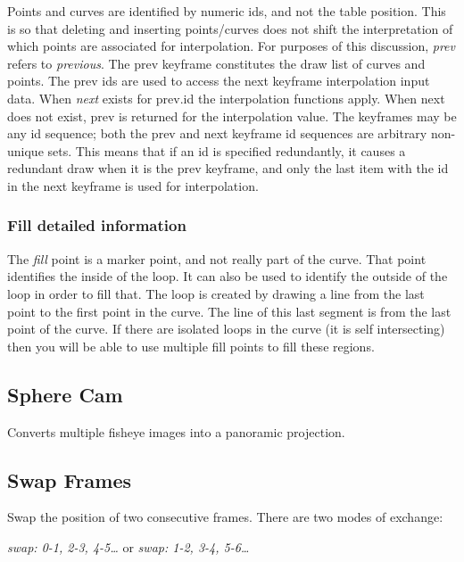 Points and curves are identified by numeric ids, and not the table position. This is so that deleting and inserting points/curves does not shift the interpretation of which points are associated for interpolation. For purposes of this discussion, \textit{prev} refers to \textit{previous}. The prev keyframe constitutes the draw list of curves and points. The prev ids are used to access the next keyframe interpolation input data. When \textit{next} exists for prev.id the interpolation functions apply. When next does not exist, prev is returned for the interpolation value. The keyframes may be any id sequence; both the prev and next keyframe id sequences are arbitrary non-unique sets. This means that if an id is specified redundantly, it causes a redundant draw when it is the prev keyframe, and only the last item with the id in the next keyframe is used for interpolation.

\subsubsection*{Fill detailed information}%
\label{ssub:fill_detailed_information}

The \textit{fill} point is a marker point, and not really part of the curve. That point identifies the inside of the loop. It can also be used to identify the outside of the loop in order to fill that. The loop is created by drawing a line from the last point to the first point in the curve. The line of this last segment is from the last point of the curve. If there are isolated loops in the curve (it is self intersecting) then you will be able to use multiple fill points to fill these regions.

\subsection{Sphere Cam}%
\label{sub:sphere_cam}

Converts multiple fisheye images into a panoramic projection.

\subsection{Swap Frames}%
\label{sub:swap_frames}

Swap the position of two consecutive frames. There are two modes of exchange:

\qquad \textit{swap: 0-1, 2-3, 4-5\dots} \qquad or \qquad \textit{swap: 1-2, 3-4, 5-6\dots}

